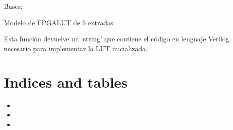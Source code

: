 \documentclass[letterpaper,10pt,english]{sphinxmanual}
\begin{document}
\begin{fulllineitems}
\label{\detokenize{myfpga:myfpga.Lut6}}
\pysigstartsignatures
{}
\pysigstopsignatures
\sphinxAtStartPar
Bases: 

\sphinxAtStartPar
Modelo de FPGA\sphinxhyphen{}LUT de 6 entradas.

\begin{fulllineitems}
\label{\detokenize{myfpga:myfpga.Lut6.impl}}
\pysigstartsignatures
{}
\pysigstopsignatures
\sphinxAtStartPar
Esta función devuelve un ‘string’ que contiene el código en lenguaje 
Verilog necesario para implementar la LUT inicializada.

\end{fulllineitems}


\end{fulllineitems}



\chapter{Indices and tables}
\label{\detokenize{index:indices-and-tables}}\begin{itemize}
\item {} 
\sphinxAtStartPar
{}

\item {} 
\sphinxAtStartPar
{}

\item {} 
\sphinxAtStartPar
{}

\end{itemize}
\end{document}
